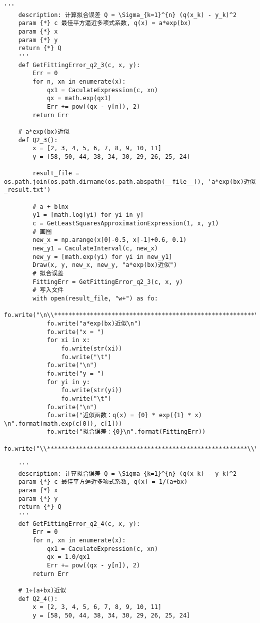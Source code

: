 \begin{lstlisting}[style = python]
    '''
    description: 计算拟合误差 Q = \Sigma_{k=1}^{n} (q(x_k) - y_k)^2 
    param {*} c 最佳平方逼近多项式系数, q(x) = a*exp(bx)
    param {*} x
    param {*} y
    return {*} Q
    '''
    def GetFittingError_q2_3(c, x, y):
        Err = 0
        for n, xn in enumerate(x):
            qx1 = CaculateExpression(c, xn)
            qx = math.exp(qx1)
            Err += pow((qx - y[n]), 2)
        return Err

    # a*exp(bx)近似
    def Q2_3():
        x = [2, 3, 4, 5, 6, 7, 8, 9, 10, 11]
        y = [58, 50, 44, 38, 34, 30, 29, 26, 25, 24]

        result_file = os.path.join(os.path.dirname(os.path.abspath(__file__)), 'a*exp(bx)近似_result.txt')

        # a + blnx
        y1 = [math.log(yi) for yi in y]
        c = GetLeastSquaresApproximationExpression(1, x, y1)
        # 画图
        new_x = np.arange(x[0]-0.5, x[-1]+0.6, 0.1)
        new_y1 = CaculateInterval(c, new_x)
        new_y = [math.exp(yi) for yi in new_y1]
        Draw(x, y, new_x, new_y, "a*exp(bx)近似")
        # 拟合误差
        FittingErr = GetFittingError_q2_3(c, x, y)
        # 写入文件
        with open(result_file, "w+") as fo:
            fo.write("\n\\********************************************************\\\n")
            fo.write("a*exp(bx)近似\n")
            fo.write("x = ")
            for xi in x:
                fo.write(str(xi))
                fo.write("\t")
            fo.write("\n")
            fo.write("y = ")
            for yi in y:
                fo.write(str(yi))
                fo.write("\t")
            fo.write("\n")
            fo.write("近似函数：q(x) = {0} * exp({1} * x) \n".format(math.exp(c[0]), c[1]))
            fo.write("拟合误差：{0}\n".format(FittingErr))
            fo.write("\\********************************************************\\\n")

    '''
    description: 计算拟合误差 Q = \Sigma_{k=1}^{n} (q(x_k) - y_k)^2 
    param {*} c 最佳平方逼近多项式系数, q(x) = 1/(a+bx)
    param {*} x
    param {*} y
    return {*} Q
    '''
    def GetFittingError_q2_4(c, x, y):
        Err = 0
        for n, xn in enumerate(x):
            qx1 = CaculateExpression(c, xn)
            qx = 1.0/qx1
            Err += pow((qx - y[n]), 2)
        return Err

    # 1÷(a+bx)近似
    def Q2_4():
        x = [2, 3, 4, 5, 6, 7, 8, 9, 10, 11]
        y = [58, 50, 44, 38, 34, 30, 29, 26, 25, 24]


\end{lstlisting}
